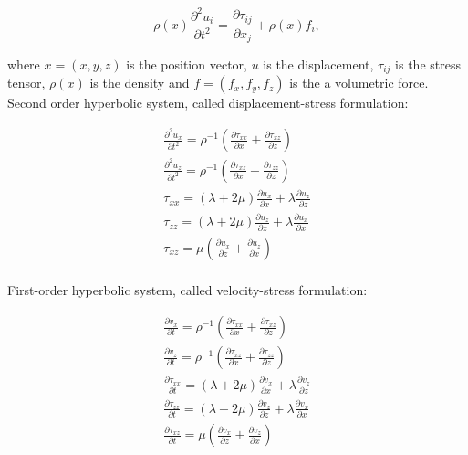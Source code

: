\documentclass{gnulike}
\begin{document}
\begin{equation}
  \label{eq:motion}
  \rho(x) \frac{\partial^{2}u_{i}}{\partial t^{2}} = \frac{\partial \tau_{ij}}{\partial x_{j}} + \rho(x)f_{i} ,
\end{equation}

\noindent where $x=(x,y,z)$ is the position vector, $u$ is the displacement, $\tau_{ij}$ is the stress tensor, $\rho(x)$ is the density and $f=(f_{x}, f_{y}, f_{z})$ is the a volumetric force.\\

\noindent Second order hyperbolic system, called displacement-stress formulation:

\begin{eqnarray}
  \label{eq:displacement-stress}
  \frac{\partial ^{2} u_{x}}{\partial t^{2}} = \rho^{{\scriptscriptstyle-1}} \left( \frac{\partial \tau_{xx}}{\partial x} + \frac{\partial \tau_{xz}}{\partial z} \right) \nonumber \\
  \frac{\partial ^{2} u_{z}}{\partial t^{2}} = \rho^{{\scriptscriptstyle -1}} \left( \frac{\partial \tau_{xz}}{\partial x} + \frac{\partial \tau_{zz}}{\partial z} \right) \nonumber \\
  \tau_{xx} = (\lambda+2\mu)\frac{\partial u_{x}}{\partial x} + \lambda \frac{\partial u_{z}}{\partial z} \\
  \tau_{zz}= (\lambda+2\mu)\frac{\partial u_{z}}{\partial z} + \lambda \frac{\partial u_{x}}{\partial x} \nonumber \\
  \tau_{xz} = \mu \left( \frac{\partial u_{x}}{\partial z} + \frac{\partial u_{z}}{\partial x } \right) \nonumber
\end{eqnarray}\\

\noindent First-order hyperbolic system, called velocity-stress formulation:

\begin{eqnarray}
  \label{eq:velocity-stress}
  \frac{\partial v_{x}}{\partial t} = \rho^{{\scriptscriptstyle-1}} \left( \frac{\partial \tau_{xx}}{\partial x} + \frac{\partial \tau_{xz}}{\partial z} \right) \nonumber \\
  \frac{\partial v_{z}}{\partial t} = \rho^{{\scriptscriptstyle -1}} \left( \frac{\partial \tau_{xz}}{\partial x} + \frac{\partial \tau_{zz}}{\partial z} \right) \nonumber \\
  \frac{\partial \tau_{xx}}{\partial t} = (\lambda+2\mu)\frac{\partial v_{x}}{\partial x} + \lambda \frac{\partial v_{z}}{\partial z} \\
  \frac{\partial \tau_{zz}}{\partial t} = (\lambda+2\mu)\frac{\partial v_{z}}{\partial z} + \lambda \frac{\partial v_{x}}{\partial x} \nonumber \\
  \frac{\partial \tau_{xz}}{\partial t} = \mu \left( \frac{\partial v_{x}}{\partial z} + \frac{\partial v_{z}}{\partial x } \right) \nonumber
\end{eqnarray}
\end{document}

